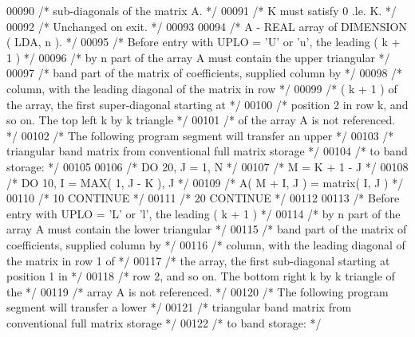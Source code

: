 \begin{DoxyCode}
00090 \textcolor{comment}{/*           sub-diagonals of the matrix A. */}
00091 \textcolor{comment}{/*           K must satisfy  0 .le. K. */}
00092 \textcolor{comment}{/*           Unchanged on exit. */}
00093 
00094 \textcolor{comment}{/*  A      - REAL             array of DIMENSION ( LDA, n ). */}
00095 \textcolor{comment}{/*           Before entry with UPLO = 'U' or 'u', the leading ( k + 1 ) */}
00096 \textcolor{comment}{/*           by n part of the array A must contain the upper triangular */}
00097 \textcolor{comment}{/*           band part of the matrix of coefficients, supplied column by */}
00098 \textcolor{comment}{/*           column, with the leading diagonal of the matrix in row */}
00099 \textcolor{comment}{/*           ( k + 1 ) of the array, the first super-diagonal starting at */}
00100 \textcolor{comment}{/*           position 2 in row k, and so on. The top left k by k triangle */}
00101 \textcolor{comment}{/*           of the array A is not referenced. */}
00102 \textcolor{comment}{/*           The following program segment will transfer an upper */}
00103 \textcolor{comment}{/*           triangular band matrix from conventional full matrix storage */}
00104 \textcolor{comment}{/*           to band storage: */}
00105 
00106 \textcolor{comment}{/*                 DO 20, J = 1, N */}
00107 \textcolor{comment}{/*                    M = K + 1 - J */}
00108 \textcolor{comment}{/*                    DO 10, I = MAX( 1, J - K ), J */}
00109 \textcolor{comment}{/*                       A( M + I, J ) = matrix( I, J ) */}
00110 \textcolor{comment}{/*              10    CONTINUE */}
00111 \textcolor{comment}{/*              20 CONTINUE */}
00112 
00113 \textcolor{comment}{/*           Before entry with UPLO = 'L' or 'l', the leading ( k + 1 ) */}
00114 \textcolor{comment}{/*           by n part of the array A must contain the lower triangular */}
00115 \textcolor{comment}{/*           band part of the matrix of coefficients, supplied column by */}
00116 \textcolor{comment}{/*           column, with the leading diagonal of the matrix in row 1 of */}
00117 \textcolor{comment}{/*           the array, the first sub-diagonal starting at position 1 in */}
00118 \textcolor{comment}{/*           row 2, and so on. The bottom right k by k triangle of the */}
00119 \textcolor{comment}{/*           array A is not referenced. */}
00120 \textcolor{comment}{/*           The following program segment will transfer a lower */}
00121 \textcolor{comment}{/*           triangular band matrix from conventional full matrix storage */}
00122 \textcolor{comment}{/*           to band storage: */}

\end{DoxyCode}
